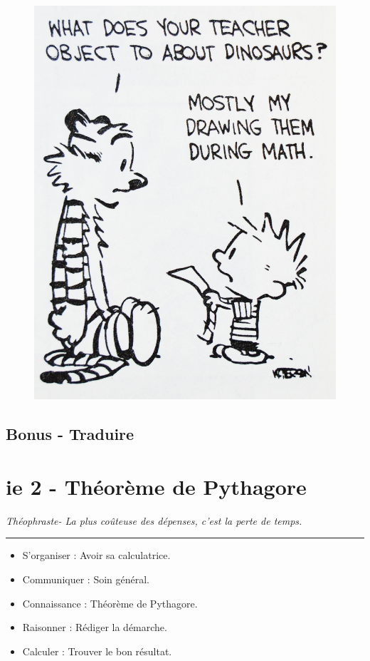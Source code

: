 \documentclass[12pt]{article}
\newcommand{\horrule}[1]{\rule{\linewidth}{#1}} %
\begin{document}
\begin{multicols}{2}
  \begin{figure}[H]
    \centering
    \includegraphics[width=0.6 \linewidth]{4x1-pythagore/sources/cah.jpg}
  \end{figure}

  \subsection*{Bonus - Traduire}

\end{multicols}

\newpage

\section*{ie 2 - Théorème de Pythagore}
\begin{center}
  \textit{Théophraste- La plus coûteuse des dépenses, c’est la perte de temps.}
\end{center}
\horrule{2px}

\begin{multicols}{2}
  \begin{itemize}
  \item S'organiser : Avoir sa calculatrice.
  \item Communiquer : Soin général.
  \item Connaissance : Théorème de Pythagore.
  \item Raisonner : Rédiger la démarche.
  \item Calculer : Trouver le bon résultat.
  \end{itemize}
\end{multicols}
\end{document}
